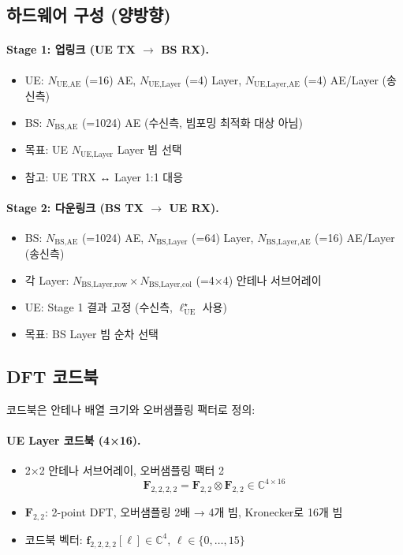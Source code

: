 \documentclass[10pt]{article}
\begin{document}
\subsection{하드웨어 구성 (양방향)}

\paragraph{Stage 1: 업링크 (UE TX $\rightarrow$ BS RX).}
\begin{itemize}
    \item UE: $N_{\text{UE,AE}}$ (=16) AE, $N_{\text{UE,Layer}}$ (=4) Layer, $N_{\text{UE,Layer,AE}}$ (=4) AE/Layer (송신측)
    \item BS: $N_{\text{BS,AE}}$ (=1024) AE (수신측, 빔포밍 최적화 대상 아님)
    \item 목표: UE $N_{\text{UE,Layer}}$ Layer 빔 선택
    \item 참고: UE TRX ↔ Layer 1:1 대응
\end{itemize}

\paragraph{Stage 2: 다운링크 (BS TX $\rightarrow$ UE RX).}
\begin{itemize}
    \item BS: $N_{\text{BS,AE}}$ (=1024) AE, $N_{\text{BS,Layer}}$ (=64) Layer, $N_{\text{BS,Layer,AE}}$ (=16) AE/Layer (송신측)
    \item 각 Layer: $N_{\text{BS,Layer,row}} \times N_{\text{BS,Layer,col}}$ (=4×4) 안테나 서브어레이
    \item UE: Stage 1 결과 고정 (수신측, $\boldsymbol{\ell}_{\text{UE}}^{\star}$ 사용)
    \item 목표: BS Layer 빔 순차 선택
\end{itemize}

\subsection{DFT 코드북}

코드북은 안테나 배열 크기와 오버샘플링 팩터로 정의:

\paragraph{UE Layer 코드북 (4×16).}
\begin{itemize}
    \item 2×2 안테나 서브어레이, 오버샘플링 팩터 2
    \begin{equation}
    \mathbf{F}_{2,2,2,2} = \mathbf{F}_{2,2} \otimes \mathbf{F}_{2,2} \in \mathbb{C}^{4 \times 16}
    \end{equation}
    \item $\mathbf{F}_{2,2}$: 2-point DFT, 오버샘플링 2배 → 4개 빔, Kronecker로 16개 빔
    \item 코드북 벡터: $\mathbf{f}_{2,2,2,2}[\ell] \in \mathbb{C}^4$, $\ell \in \{0, \ldots, 15\}$
\end{itemize}
\end{document}
